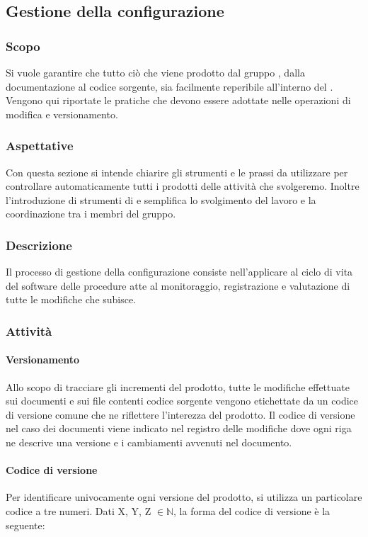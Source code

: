 \subsection{Gestione della configurazione}

\subsubsection{Scopo}
Si vuole garantire che tutto ciò che viene prodotto dal gruppo \Gruppo{}, dalla documentazione al codice sorgente, sia facilmente reperibile all’interno del .
Vengono qui riportate le pratiche che devono essere adottate nelle operazioni di modifica e versionamento.

\subsubsection{Aspettative}
Con questa sezione si intende chiarire gli strumenti e le prassi da utilizzare per controllare automaticamente tutti i prodotti delle attività che svolgeremo.
Inoltre l'introduzione di strumenti di  e  semplifica lo svolgimento del lavoro e la coordinazione tra i membri del gruppo.

\subsubsection{Descrizione}
Il processo di gestione della configurazione consiste nell'applicare al ciclo di vita del software delle procedure atte al monitoraggio, registrazione e valutazione di tutte 
le modifiche che subisce.

\subsubsection{Attività}

\paragraph{Versionamento}
Allo scopo di tracciare gli incrementi del prodotto, tutte le modifiche effettuate sui documenti e sui file contenti codice sorgente vengono etichettate da un codice di versione comune che ne riflettere l'interezza del prodotto. Il codice di versione nel caso dei documenti viene indicato nel registro delle modifiche dove ogni riga ne descrive una versione e i cambiamenti avvenuti nel documento.

\paragraph*{Codice di versione}
Per identificare univocamente ogni versione del prodotto, si utilizza un particolare codice a tre numeri. Dati X, Y, Z $\in \mathbb{N}$, la forma del codice di versione è la seguente:

